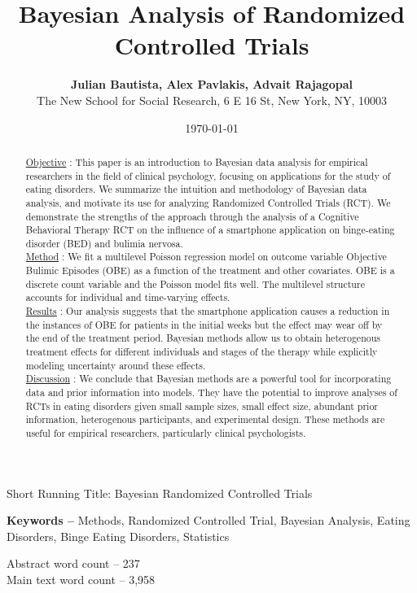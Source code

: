 \documentclass{article}
\title{\textbf{Bayesian Analysis of Randomized Controlled Trials}}
\author{\textbf{Julian Bautista, Alex Pavlakis, Advait Rajagopal} \\ 
            {The New School for Social Research, 6 E 16 St, New York, NY, 10003}}
\date{\today}
\providecommand{\keywords}[1]{\textbf{Keywords --} #1}
\newcommand\blfootnote[1]{%
  \begingroup
  \renewcommand\thefootnote{}\footnote{#1}%
  \addtocounter{footnote}{-1}%
  \endgroup
}
\begin{document}
\maketitle

Short Running Title: Bayesian Randomized Controlled Trials

\begin{abstract}
\noindent \underline{Objective} : This paper is an introduction to Bayesian data analysis for empirical researchers in the field of clinical psychology, focusing on applications for the study of eating disorders.  We summarize the intuition and methodology of Bayesian data analysis, and motivate its use for analyzing Randomized Controlled Trials (RCT).  We demonstrate the strengths of the approach through the analysis of a Cognitive Behavioral Therapy RCT on the influence of a smartphone application on binge-eating disorder (BED) and bulimia nervosa.\\
\noindent \underline{Method} : We fit a multilevel Poisson regression model on outcome variable Objective Bulimic Episodes (OBE) as a function of the treatment and other covariates. OBE is a discrete count variable and the Poisson model fits well. The multilevel structure accounts for individual and time-varying effects.\\
\noindent \underline{Results} : Our analysis suggests that the smartphone application causes a reduction in the instances of OBE for patients in the initial weeks but the effect may wear off by the end of the treatment period. Bayesian methods allow us to obtain heterogenous treatment effects for different individuals and stages of the therapy while explicitly modeling uncertainty around these effects.\\
\noindent \underline{Discussion} : We conclude that Bayesian methods are a powerful tool for incorporating data and prior information into models. They have the potential to improve analyses of RCTs in eating disorders given small sample sizes, small effect size, abundant prior information, heterogenous participants, and experimental design. These methods are useful for empirical researchers, particularly clinical psychologists.
\end{abstract}

\keywords{Methods, Randomized Controlled Trial, Bayesian Analysis, Eating Disorders, Binge Eating Disorders, Statistics}

Abstract word count -- 237\\
Main text word count -- 3,958\\
\end{document}
